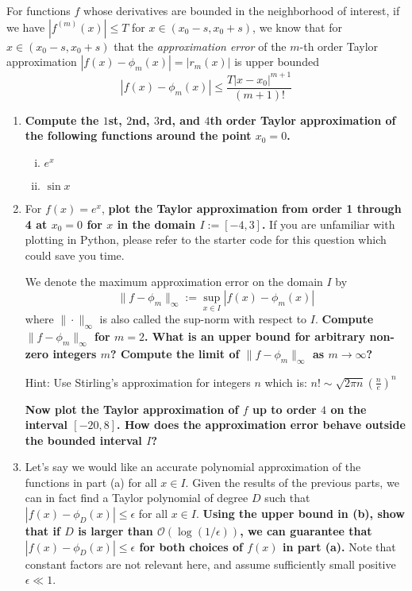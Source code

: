 \documentclass{article}\usepackage[utf8]{inputenc}\usepackage[margin=0.4cm,top=0.4cm,bottom=0.4cm]{geometry}\usepackage[usenames,dvipsnames,svgnames,table]{xcolor}
\begin{document}
\noindent For functions $f$ whose derivatives are bounded in the neighborhood of interest, if we have $|f^{(m)}(x)| \leqslant T$ for $x\in (x_0 - s, x_0 + s)$, we know that for $x\in (x_0 -s, x_0 + s)$ that the \textit{approximation error} of the $m$-th order Taylor approximation $|f(x) - \phi_m(x)| = |r_m(x)|$ is upper bounded $$|f(x) - \phi_m(x)|\leqslant \frac{T|x-x_0|^{m+1}}{(m + 1)!}$$
\begin{enumerate}
\item \textbf{Compute the $1$st, $2$nd, $3$rd, and $4$th order Taylor approximation of the following functions around the point $x_0 = 0$.}
\begin{enumerate}[i.]
\item $\displaystyle e^x$
\BeginSolution

\EndSolution
\item $\displaystyle \sin x$
\BeginSolution

\EndSolution
\end{enumerate}
\item For $f(x) = e^x$, \textbf{plot the Taylor approximation from order 1 through 4 at $x_0 = 0$ for $x$ in the domain $I:= [-4,3]$.} If you are unfamiliar with plotting in Python, please refer to the starter code for this question which could save you time.
\vspace{4pt}

We denote the maximum approximation error on the domain $I$ by $$\|f - \phi_m\|_{\infty} := \sup_{x\in I} |f(x) - \phi_m(x)|$$ where $\| \cdot\|_{\infty}$ is also called the sup-norm with respect to $I$. \textbf{Compute $\|f - \phi_m\|_{\infty}$ for $m=2$. What is an upper bound for arbitrary non-zero integers $m$? Compute the limit of $\|f - \phi_m\|_{\infty}$ as $m\rightarrow \infty$?}
\vspace{4pt}

Hint: Use Stirling's approximation for integers $n$ which is: $n!\sim \sqrt{2\pi n}\left(\frac ne\right)^n$
\vspace{4pt}

\textbf{Now plot the Taylor approximation of $f$ up to order $4$ on the interval $[-20, 8]$. How does the approximation error behave outside the bounded interval $I$?}
\BeginSolution

\EndSolution
\item Let's say we would like an accurate polynomial approximation of the functions in part (a) for all $x \in I$. Given the results of the previous parts, we can in fact find a Taylor polynomial of degree $D$ such that $|f(x) - \phi_D(x)| \leqslant \epsilon$ for all $x \in I$. \textbf{Using the upper bound in (b), show that if $D$ is larger than $\mathcal{O}(\log(1/\epsilon))$, we can guarantee that $|f(x) - \phi_D(x)| \leqslant \epsilon$ for both choices of $f(x)$ in part (a).} Note that constant factors are not relevant here, and assume sufficiently small positive $\epsilon \ll 1$.
\BeginSolution


\end{enumerate}
\end{document}
